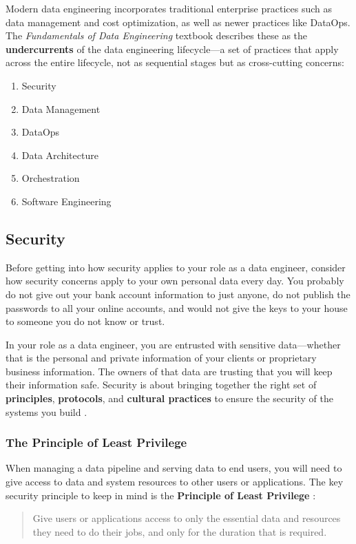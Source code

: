 \documentclass{article}
\begin{document}
Modern data engineering incorporates traditional enterprise practices such as data management and cost optimization, as well as newer practices like DataOps. The \textit{Fundamentals of Data Engineering} textbook describes these as the \textbf{undercurrents} of the data engineering lifecycle---a set of practices that apply across the entire lifecycle, not as sequential stages but as cross-cutting concerns:
\begin{enumerate}
    \item Security
    \item Data Management
    \item DataOps
    \item Data Architecture
    \item Orchestration
    \item Software Engineering
\end{enumerate}

\subsection{Security}
\label{sec:security}
Before getting into how security applies to your role as a data engineer, consider how security concerns apply to your own personal data every day. You probably do not give out your bank account information to just anyone, do not publish the passwords to all your online accounts, and would not give the keys to your house to someone you do not know or trust.

In your role as a data engineer, you are entrusted with sensitive data---whether that is the personal and private information of your clients or proprietary business information. The owners of that data are trusting that you will keep their information safe. Security is about bringing together the right set of \textbf{principles}, \textbf{protocols}, and \textbf{cultural practices} to ensure the security of the systems you build \cite{reis2022fundamentals}.

\subsubsection{The Principle of Least Privilege}
When managing a data pipeline and serving data to end users, you will need to give access to data and system resources to other users or applications. The key security principle to keep in mind is the \textbf{Principle of Least Privilege} \cite{saltzer1975protection}:
\begin{quote}
    Give users or applications access to only the essential data and resources they need to do their jobs, and only for the duration that is required.
\end{quote}
\end{document}
